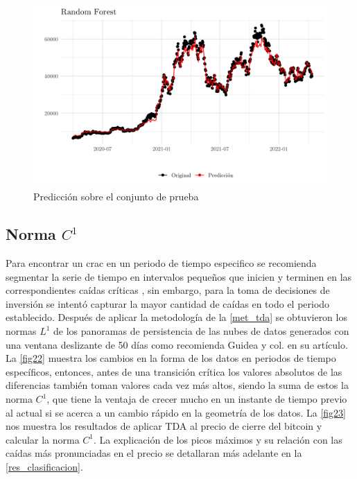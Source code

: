 \begin{figure}
	\centering
	\includegraphics[scale=0.35]{Chapter5/pred_RF.png}
	\caption{Predicción sobre el conjunto de prueba}
	\label{fig21}
\end{figure}

\subsection{Norma $C^1$}

Para encontrar un crac en un periodo de tiempo especifico se recomienda segmentar la serie de tiempo en intervalos pequeños que inicien y terminen en las correspondientes caídas críticas \parencite{gideaTopologicalRecognitionCritical2020}, sin embargo, para la toma de decisiones de inversión se intentó capturar la mayor cantidad de caídas en todo el periodo establecido. Después de aplicar la metodología de la \autoref{met_tda} se obtuvieron los normas $L^1$ de los panoramas de persistencia de las nubes de datos generados con una ventana deslizante de 50 días como recomienda Guidea y col. \parencite*{gideaTopologicalRecognitionCritical2020} en su artículo. La \autoref{fig22} muestra los cambios en la forma de los datos en periodos de tiempo específicos, entonces, antes de una transición crítica los valores absolutos de las diferencias también toman valores cada vez más altos, siendo la suma de estos la norma $C^1$, que tiene la ventaja de crecer mucho en un instante de tiempo previo al actual si se acerca a un cambio rápido en la geometría de los datos. La \autoref{fig23} nos muestra los resultados de aplicar TDA al precio de cierre del bitcoin y calcular la norma $C^1$. La explicación de los picos máximos y su relación con las caídas más pronunciadas en el precio se detallaran más adelante en la \autoref{res_clasificacion}.

